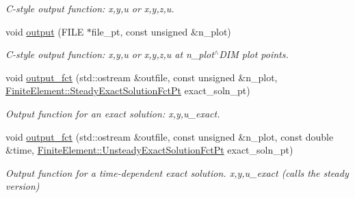 \begin{DoxyCompactItemize}
\begin{DoxyCompactList}\small\item\em C-\/style output function\+: x,y,u or x,y,z,u. \end{DoxyCompactList}\item 
void \hyperlink{classoomph_1_1TUnsteadyHeatElement_ae557037d0c9eef1143aef52decb559ca}{output} (F\+I\+LE $\ast$file\+\_\+pt, const unsigned \&n\+\_\+plot)
\begin{DoxyCompactList}\small\item\em C-\/style output function\+: x,y,u or x,y,z,u at n\+\_\+plot$^\wedge$\+D\+IM plot points. \end{DoxyCompactList}\item 
void \hyperlink{classoomph_1_1TUnsteadyHeatElement_ab96efdf223b23caa747ca79dae88c847}{output\+\_\+fct} (std\+::ostream \&outfile, const unsigned \&n\+\_\+plot, \hyperlink{classoomph_1_1FiniteElement_a690fd33af26cc3e84f39bba6d5a85202}{Finite\+Element\+::\+Steady\+Exact\+Solution\+Fct\+Pt} exact\+\_\+soln\+\_\+pt)
\begin{DoxyCompactList}\small\item\em Output function for an exact solution\+: x,y,u\+\_\+exact. \end{DoxyCompactList}\item 
void \hyperlink{classoomph_1_1TUnsteadyHeatElement_af550a3be2cd261c495ee0c97a3ca29a7}{output\+\_\+fct} (std\+::ostream \&outfile, const unsigned \&n\+\_\+plot, const double \&time, \hyperlink{classoomph_1_1FiniteElement_ad4ecf2b61b158a4b4d351a60d23c633e}{Finite\+Element\+::\+Unsteady\+Exact\+Solution\+Fct\+Pt} exact\+\_\+soln\+\_\+pt)
\begin{DoxyCompactList}\small\item\em Output function for a time-\/dependent exact solution. x,y,u\+\_\+exact (calls the steady version) \end{DoxyCompactList}\end{DoxyCompactItemize}
